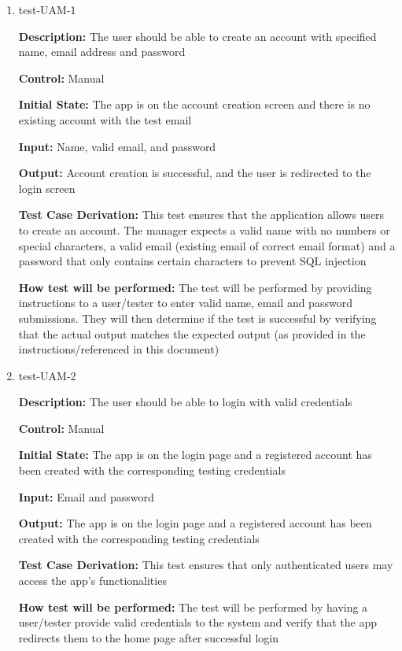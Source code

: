 \documentclass[12pt, titlepage]{article}
\begin{document}
\begin{enumerate}

\item{test-UAM-1\\}

\textbf{Description:} The user should be able to create an account with specified name, email address and password

\textbf{Control:} Manual
					
\textbf{Initial State:} The app is on the account creation screen and there is no existing account with the test email
					
\textbf{Input:} Name, valid email, and password
					
\textbf{Output:} Account creation is successful, and the user is redirected to the login screen

\textbf{Test Case Derivation:} This test ensures that the application allows users to create an account. The manager expects a valid name with no numbers or special characters, a valid email (existing email of correct email format) and a password that only contains certain characters to prevent SQL injection
					
\textbf{How test will be performed:} The test will be performed by providing instructions to a user/tester to enter valid name, email and password submissions. They will then determine if the test is successful by verifying that the actual output matches the expected output (as provided in the instructions/referenced in this document)

\item{test-UAM-2\\}

\textbf{Description:} The user should be able to login with valid credentials

\textbf{Control:} Manual
					
\textbf{Initial State:} The app is on the login page and a registered account has been created with the corresponding testing credentials
					
\textbf{Input:} Email and password
					
\textbf{Output:} The app is on the login page and a registered account has been created with the corresponding testing credentials

\textbf{Test Case Derivation:} This test ensures that only authenticated users may access the app's functionalities

\textbf{How test will be performed:} The test will be performed by having a user/tester provide valid credentials to the system and verify that the app redirects them to the home page after successful login


\end{enumerate}
\end{document}
